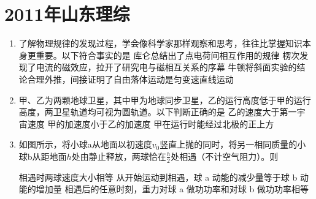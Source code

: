 \documentclass[\gkver]{gaokaozhenti}
\begin{document}
\chapter{2011年山东理综}

\begin{enumerate}
\item
了解物理规律的发现过程，学会像科学家那样观察和思考，往往比掌握知识本身更重要。以下符合事实的是
{库仑总结出了点电荷间相互作用的规律}
{楞次发现了电流的磁效应，拉开了研究电与磁相互关系的序幕}
{牛顿将斜面实验的结论合理外推，间接证明了自由落体运动是匀变速直线运动}


\item
甲、乙为两颗地球卫星，其中甲为地球同步卫星，乙的运行高度低于甲的运行高度，两卫星轨道均可视为圆轨道。以下判断正确的是
{乙的速度大于第一宇宙速度}
{甲的加速度小于乙的加速度}
{甲在运行时能经过北极的正上方}


\item
如图所示，将小球a从地面以初速度$v_{0}$竖直上抛的同时，将另一相同质量的小球b从距地面$h$处由静止释放，两球恰在$\frac{h}{2}$处相遇（不计空气阻力）。则


{相遇时两球速度大小相等}
{从开始运动到相遇，球 a 动能的减少量等于球 b 动能的增加量}
{相遇后的任意时刻，重力对球 a 做功功率和对球 b 做功功率相等}


\end{enumerate}
\end{document}
